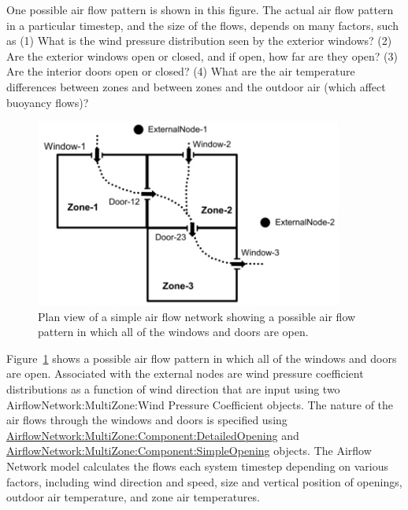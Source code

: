 One possible air flow pattern is shown in this figure. The actual air flow pattern in a particular timestep, and the size of the flows, depends on many factors, such as (1) What is the wind pressure distribution seen by the exterior windows? (2) Are the exterior windows open or closed, and if open, how far are they open? (3) Are the interior doors open or closed? (4) What are the air temperature differences between zones and between zones and the outdoor air (which affect buoyancy flows)?

\begin{figure}[hbtp] %
\centering
\includegraphics[width=0.9\textwidth, height=0.9\textheight, keepaspectratio=true]{media/image216.png}
\caption{Plan view of a simple air flow network showing a possible air flow pattern in which all of the windows and doors are open. \protect \label{fig:plan-view-of-a-simple-air-flow-network}}
\end{figure}

Figure~\ref{fig:plan-view-of-a-simple-air-flow-network} shows a possible air flow pattern in which all of the windows and doors are open. Associated with the external nodes are wind pressure coefficient distributions as a function of wind direction that are input using two AirflowNetwork:MultiZone:Wind Pressure Coefficient objects. The nature of the air flows through the windows and doors is specified using \hyperref[airflownetworkmultizonecomponentdetailedopening]{AirflowNetwork:MultiZone:Component:DetailedOpening} and \hyperref[airflownetworkmultizonecomponentsimpleopening]{AirflowNetwork:MultiZone:Component:SimpleOpening} objects. The Airflow Network model calculates the flows each system timestep depending on various factors, including wind direction and speed, size and vertical position of openings, outdoor air temperature, and zone air temperatures.

